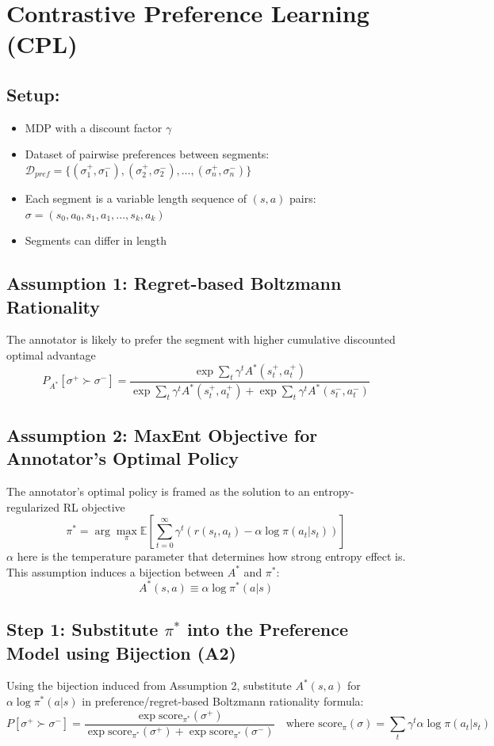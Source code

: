\documentclass{article}
\begin{document}
\section*{Contrastive Preference Learning (CPL)}

\subsection*{Setup:}
\begin{itemize}
    \item MDP with a discount factor $\gamma$
    \item Dataset of pairwise preferences between segments: $\mathcal{D}_{pref} = \{(\sigma_1^+, \sigma_1^-), (\sigma_2^+, \sigma_2^-), ..., (\sigma_n^+, \sigma_n^-)\}$
    \item Each segment is a variable length sequence of $(s, a)$ pairs: $\sigma = (s_0, a_0, s_1, a_1, ..., s_k, a_k)$
    \item Segments can differ in length
\end{itemize}

\subsection*{Assumption 1: Regret-based Boltzmann Rationality}
The annotator is likely to prefer the segment with higher cumulative discounted optimal advantage
$$P_{A^*}[\sigma^+ \succ \sigma^-] = \frac{\exp \sum_t \gamma^t A^*(s_t^+, a_t^+)}{\exp \sum_t \gamma^t A^*(s_t^+, a_t^+) + \exp \sum_t \gamma^t A^*(s_t^-, a_t^-)}$$

\subsection*{Assumption 2: MaxEnt Objective for Annotator's Optimal Policy}
The annotator's optimal policy is framed as the solution to an entropy-regularized RL objective
$$\pi^* = \arg\max_\pi \mathbb{E} \left[ \sum_{t=0}^\infty \gamma^t (r(s_t, a_t) - \alpha \log \pi(a_t|s_t)) \right]$$
$\alpha$ here is the temperature parameter that determines how strong entropy effect is.\\
This assumption induces a bijection between $A^*$ and $\pi^*$:
$$A^*(s, a) \equiv \alpha \log \pi^*(a|s)$$

\subsection*{Step 1: Substitute $\pi^*$ into the Preference Model using Bijection (A2)}
Using the bijection induced from Assumption 2, substitute $A^*(s, a)$ for $\alpha \log \pi^*(a|s)$ in preference/regret-based Boltzmann rationality formula:
$$P[\sigma^+ \succ \sigma^-] = \frac{\exp \text{score}_{\pi^*}(\sigma^+)}{\exp \text{score}_{\pi^*}(\sigma^+) + \exp \text{score}_{\pi^*}(\sigma^-)} \quad \text{where } \text{score}_\pi(\sigma) = \sum_t \gamma^t \alpha \log \pi(a_t|s_t)$$
\end{document}
